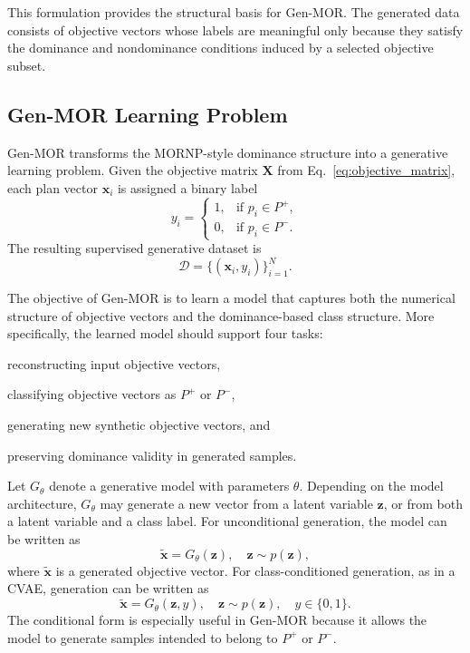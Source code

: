 This formulation provides the structural basis for Gen-MOR. The generated data consists of objective vectors whose labels are meaningful only because they satisfy the dominance and nondominance conditions induced by a selected objective subset.

\subsection{Gen-MOR Learning Problem}
\label{subsec:genmor_learning_problem}

Gen-MOR transforms the MORNP-style dominance structure into a generative learning problem. Given the objective matrix $\mathbf{X}$ from Eq.~\eqref{eq:objective_matrix}, each plan vector $\mathbf{x}_i$ is assigned a binary label
\begin{equation}
    y_i =
    \begin{cases}
        1, & \text{if } p_i \in P^{+},\\
        0, & \text{if } p_i \in P^{-}.
    \end{cases}
    \label{eq:label_definition}
\end{equation}
The resulting supervised generative dataset is
\begin{equation}
    \mathcal{D}
    =
    \{(\mathbf{x}_i, y_i)\}_{i=1}^{N}.
    \label{eq:genmor_dataset}
\end{equation}

The objective of Gen-MOR is to learn a model that captures both the numerical structure of objective vectors and the dominance-based class structure. More specifically, the learned model should support four tasks:
\begin{compactenum}
    \item reconstructing input objective vectors,
    \item classifying objective vectors as $P^{+}$ or $P^{-}$,
    \item generating new synthetic objective vectors, and
    \item preserving dominance validity in generated samples.
\end{compactenum}

Let $G_{\theta}$ denote a generative model with parameters $\theta$. Depending on the model architecture, $G_{\theta}$ may generate a new vector from a latent variable $\mathbf{z}$, or from both a latent variable and a class label. For unconditional generation, the model can be written as
\begin{equation}
    \tilde{\mathbf{x}} = G_{\theta}(\mathbf{z}),
    \quad
    \mathbf{z} \sim p(\mathbf{z}),
    \label{eq:unconditional_generation}
\end{equation}
where $\tilde{\mathbf{x}}$ is a generated objective vector. For class-conditioned generation, as in a CVAE, generation can be written as
\begin{equation}
    \tilde{\mathbf{x}} = G_{\theta}(\mathbf{z}, y),
    \quad
    \mathbf{z} \sim p(\mathbf{z}),
    \quad
    y \in \{0,1\}.
    \label{eq:conditional_generation}
\end{equation}
The conditional form is especially useful in Gen-MOR because it allows the model to generate samples intended to belong to $P^{+}$ or $P^{-}$.

